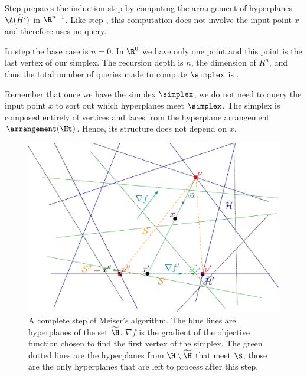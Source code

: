 Step  prepares the induction step by computing the arrangement of
hyperplanes \(\A(\widetilde{H}')\) in \(\R^{n-1}\). Like step , this
computation does not involve the input point \(x\) and therefore uses no query.

In step  the base case is $n = 0$. In $\R^0$ we have only one point
and this point is the last vertex of our simplex.
The recursion depth is $n$, the dimension of $R^n$, and thus the total number
of queries made to compute $\simplex$ is .

Remember that once we have the simplex $\simplex$, we do not need to query the
input point $x$ to sort out which hyperplanes meet $\simplex$. The simplex is
composed entirely of vertices and faces from the hyperplane arrangement
$\arrangement(\Ht)$. Hence, its structure does not depend on $x$.

\begin{figure}
\begin{center}
\includegraphics[trim=110 40 50 30,clip=true,height=0.3\textheight]{fig/point-location/simplex.eps}
\caption{
A complete step of Meiser's algorithm. The blue lines are hyperplanes of the
set \(\widetilde{\H}\). \(\nabla f\) is the gradient of the objective function
chosen to find the first vertex of the simplex. The green dotted lines are the
hyperplanes from \(\H \setminus \widetilde{\H}\) that meet \(\S\), those are
the only hyperplanes that are left to process after this step.
}
\label{fig:meiser:step}
\end{center}
\end{figure}

